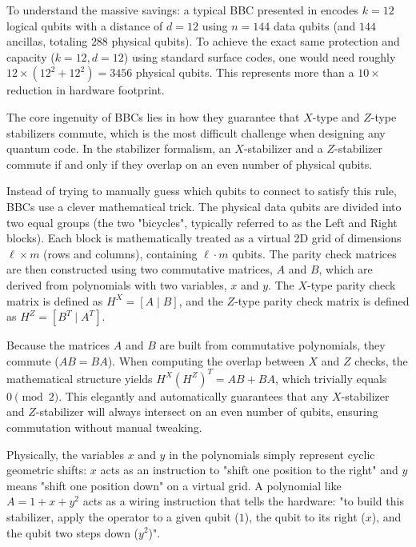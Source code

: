 To understand the massive savings: a typical BBC presented in \cite{bravyi2024high} encodes $k=12$ logical qubits with a distance of $d=12$ using $n=144$ data qubits (and $144$ ancillas, totaling $288$ physical qubits). To achieve the exact same protection and capacity ($k=12, d=12$) using standard surface codes, one would need roughly $12 \times (12^2 + 12^2) = 3456$ physical qubits. This represents more than a $10\times$ reduction in hardware footprint.

The core ingenuity of BBCs lies in how they guarantee that $X$-type and $Z$-type stabilizers commute, which is the most difficult challenge when designing any quantum code. In the stabilizer formalism, an $X$-stabilizer and a $Z$-stabilizer commute if and only if they overlap on an even number of physical qubits. 

Instead of trying to manually guess which qubits to connect to satisfy this rule, BBCs use a clever mathematical trick. The physical data qubits are divided into two equal groups (the two "bicycles", typically referred to as the Left and Right blocks). Each block is mathematically treated as a virtual 2D grid of dimensions $\ell \times m$ (rows and columns), containing $\ell \cdot m$ qubits. The parity check matrices are then constructed using two commutative matrices, $A$ and $B$, which are derived from polynomials with two variables, $x$ and $y$. The $X$-type parity check matrix is defined as $H^X = [A \mid B]$, and the $Z$-type parity check matrix is defined as $H^Z = [B^T \mid A^T]$.

Because the matrices $A$ and $B$ are built from commutative polynomials, they commute ($AB = BA$). When computing the overlap between $X$ and $Z$ checks, the mathematical structure yields $H^X (H^Z)^T = AB + BA$, which trivially equals $0 \pmod 2$. This elegantly and automatically guarantees that any $X$-stabilizer and $Z$-stabilizer will always intersect on an even number of qubits, ensuring commutation without manual tweaking.

Physically, the variables $x$ and $y$ in the polynomials simply represent cyclic geometric shifts: $x$ acts as an instruction to "shift one position to the right" and $y$ means "shift one position down" on a virtual grid. A polynomial like $A = 1 + x + y^2$ acts as a wiring instruction that tells the hardware: "to build this stabilizer, apply the operator to a given qubit ($1$), the qubit to its right ($x$), and the qubit two steps down ($y^2$)". 

